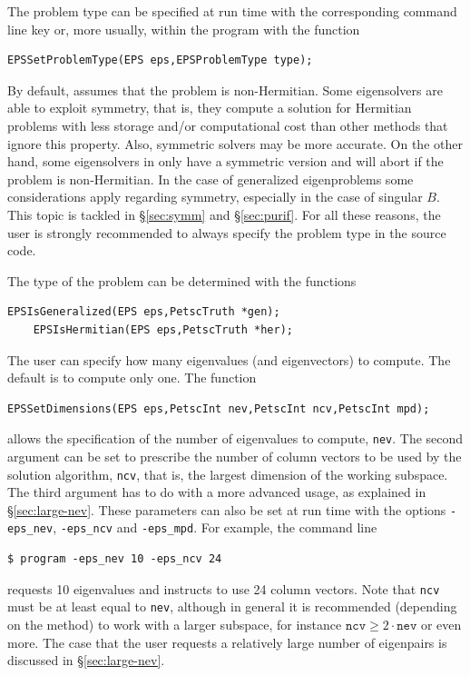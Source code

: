 The problem type can be specified at run time with the corresponding command line key or, more usually, within the program with the function
	\begin{Verbatim}[fontsize=\small]
	EPSSetProblemType(EPS eps,EPSProblemType type);
	\end{Verbatim}

By default, \slepc assumes that the problem is non-Hermitian. Some eigensolvers are able to exploit symmetry, that is, they compute a solution for Hermitian problems with less storage and/or computational cost than other methods that ignore this property. Also, symmetric solvers may be more accurate. On the other hand, some eigensolvers in \slepc only have a symmetric version and will abort if the problem is non-Hermitian. 
In the case of generalized eigenproblems some considerations apply regarding symmetry, especially in the case of singular $B$. This topic is tackled in \S\ref{sec:symm} and \S\ref{sec:purif}.
For all these reasons, the user is strongly recommended to always specify the problem type in the source code. 

	The type of the problem can be determined with the functions
	 
	\begin{Verbatim}[fontsize=\small]
	EPSIsGeneralized(EPS eps,PetscTruth *gen);
	EPSIsHermitian(EPS eps,PetscTruth *her);
	\end{Verbatim}

	The user can specify how many eigenvalues (and eigenvectors) to compute. The default is to compute only one. The function
	\begin{Verbatim}[fontsize=\small]
	EPSSetDimensions(EPS eps,PetscInt nev,PetscInt ncv,PetscInt mpd);
	\end{Verbatim}
allows the specification of the number of eigenvalues to compute, \texttt{nev}. The second argument can be set to prescribe the number of column vectors to be used by the solution algorithm, \texttt{ncv}, that is, the largest dimension of the working subspace. The third argument has to do with a more advanced usage, as explained in \S\ref{sec:large-nev}. These parameters can also be set at run time with the options \Verb!-eps_nev!, \Verb!-eps_ncv! and \Verb!-eps_mpd!. For example, the command line
\begin{Verbatim}[fontsize=\small]
	$ program -eps_nev 10 -eps_ncv 24
\end{Verbatim}
requests 10 eigenvalues and instructs to use 24 column vectors. Note that \texttt{ncv} must be at least equal to \texttt{nev}, although in general it is recommended (depending on the method) to work with a larger subspace, for instance $\mathtt{ncv}\geq2\cdot\mathtt{nev}$ or even more. The case that the user requests a relatively large number of eigenpairs is discussed in \S\ref{sec:large-nev}.

